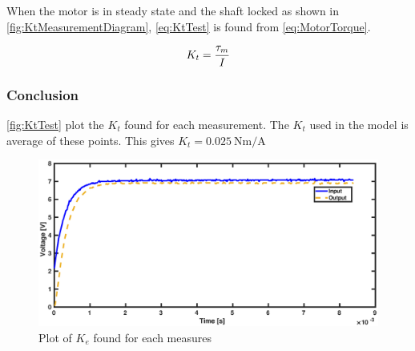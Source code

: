 When the motor is in steady state and the shaft locked as shown in \autoref{fig:KtMeasurementDiagram}, \autoref{eq:KtTest} is found from \autoref{eq:MotorTorque}.

\begin{equation}\label{eq:KtTest}
K_t=\frac{\tau_m}{I} \addunit{\newton\meter\per\ampere}
\end{equation}
\startexplain
{}
\stopexplain

\subsubsection*{Conclusion}

\autoref{fig:KtTest} plot the $K_t$ found for each measurement. The $K_t$ used in the model is average of these points. This gives $K_t=\SI{0.025}{\newton\meter\per\ampere}$

\begin{figure}[htbp]
	\centering
	\includegraphics[width=\textwidth]{figures/appendix/Motor&GearTests/RmLmDataPlot}
	\caption{Plot of $K_e$ found for each measures}\label{fig:KtTest}
\end{figure}